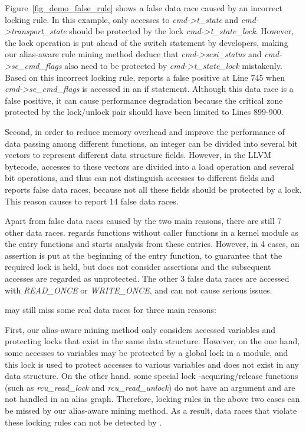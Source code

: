 Figure~\ref{fig_demo_false_rule} shows a false data race caused by an incorrect 
locking rule. In this example, only accesses to {\em cmd->t\_state} and {\em 
cmd->transport\_state} should be protected by the lock {\em 
cmd->t\_state\_lock}. However, the lock operation is put ahead of the switch 
statement by developers, making our alias-aware rule mining method deduce that 
{\em cmd->scsi\_status} and {\em cmd->se\_cmd\_flags} also need to be protected 
by {\em cmd->t\_state\_lock} mistakenly. Based on this incorrect locking rule, 
\sys reports a false positive at Line 745 when {\em cmd->se\_cmd\_flags} is 
accessed in an if statement. Although this data race is a false positive, it 
can cause performance degradation because the critical zone protected by the 
lock/unlock pair should have been limited to Lines 899-900.

Second, in order to reduce memory overhead and improve the performance of data 
passing among different functions, an integer can be divided into several bit 
vectors to represent different data structure fields. However, in the LLVM 
bytecode, accesses to these vectors are divided into a load operation and 
several bit operations, and thus \sys can not distinguish accesses to different 
fields and reports false data races, because not all these fields should be 
protected by a lock. This reason causes \sys to report 14 false data races.

Apart from false data races caused by the two main reasons, there are still 7 
other data races. \sys regards functions without caller functions in a kernel 
module as the entry functions and starts analysis from these entries. However, 
in 4 cases, an assertion is put at the beginning of the entry function, to 
guarantee that the required lock is held, but \sys does not consider assertions 
and the subsequent accesses are regarded as unprotected. The other 3 false data 
races are accessed with {\em READ\_ONCE} or {\em WRITE\_ONCE}, and can not 
cause serious issues.

 \sys may still miss some real data races for three main 
reasons:

First, our alias-aware mining method only considers accessed variables and 
protecting locks that exist in the same data structure. However, on the one 
hand, some accesses to variables may be protected by a global lock in a module, 
and this lock is used to protect accesses to various variables and does 
not exist in any data structure. On the other hand, some special lock 
-acquiring/release functions (such as {\em rcu\_read\_lock} and {\em 
rcu\_read\_unlock}) do not have an argument and are not handled in an alias 
graph. Therefore, locking rules in the above two cases can be missed by our 
alias-aware mining method. As a result, data races that violate these locking 
rules can not be detected by \sys.

